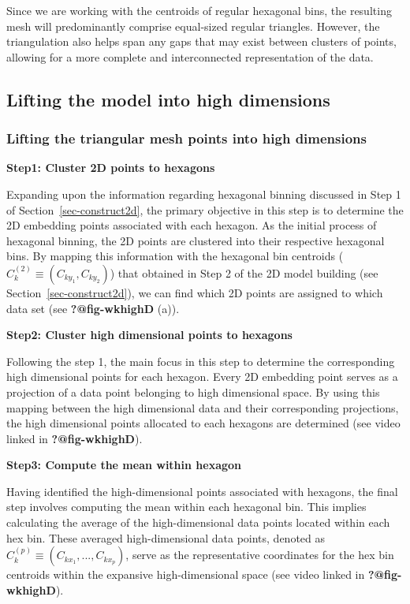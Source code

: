 \documentclass[
  12pt]{article}
\begin{document}
Since we are working with the centroids of regular hexagonal bins, the
resulting mesh will predominantly comprise equal-sized regular
triangles. However, the triangulation also helps span any gaps that may
exist between clusters of points, allowing for a more complete and
interconnected representation of the data.

\hypertarget{lifting-the-model-into-high-dimensions}{%
\subsection{Lifting the model into high
dimensions}\label{lifting-the-model-into-high-dimensions}}

\hypertarget{lifting-the-triangular-mesh-points-into-high-dimensions}{%
\subsubsection{Lifting the triangular mesh points into high
dimensions}\label{lifting-the-triangular-mesh-points-into-high-dimensions}}

\textbf{Step1: Cluster 2D points to hexagons}

Expanding upon the information regarding hexagonal binning discussed in
Step 1 of Section~\ref{sec-construct2d}, the primary objective in this
step is to determine the 2D embedding points associated with each
hexagon. As the initial process of hexagonal binning, the 2D points are
clustered into their respective hexagonal bins. By mapping this
information with the hexagonal bin centroids
(\(C_k^{(2)} \equiv (C_{ky_1}, C_{ky_2})\)) that obtained in Step 2 of
the 2D model building (see Section~\ref{sec-construct2d}), we can find
which 2D points are assigned to which data set (see
\textbf{?@fig-wkhighD} (a)).

\textbf{Step2: Cluster high dimensional points to hexagons}

Following the step 1, the main focus in this step to determine the
corresponding high dimensional points for each hexagon. Every 2D
embedding point serves as a projection of a data point belonging to high
dimensional space. By using this mapping between the high dimensional
data and their corresponding projections, the high dimensional points
allocated to each hexagons are determined (see video linked in
\textbf{?@fig-wkhighD}).

\textbf{Step3: Compute the mean within hexagon}

Having identified the high-dimensional points associated with hexagons,
the final step involves computing the mean within each hexagonal bin.
This implies calculating the average of the high-dimensional data points
located within each hex bin. These averaged high-dimensional data
points, denoted as \(C_k^{(p)} \equiv (C_{kx_1}, ..., C_{kx_p})\), serve
as the representative coordinates for the hex bin centroids within the
expansive high-dimensional space (see video linked in
\textbf{?@fig-wkhighD}).
\end{document}
